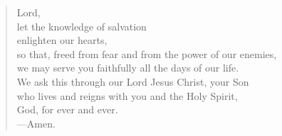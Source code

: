 \prayer

\setlength{\leftmargini}{\prayerleftmargini}

\begin{verse}
Lord,\\
let the knowledge of salvation\\
enlighten our hearts,\\
so that, freed from fear and from the power of our enemies,\\
we may serve you faithfully all the days of our life.\\
We ask this through our Lord Jesus Christ, your Son\\
who lives and reigns with you and the Holy Spirit,\\
God, for ever and ever.\\
{\color{red}---\thinspace}Amen.
\end{verse}

\setlength{\leftmargini}{\defleftmargini}